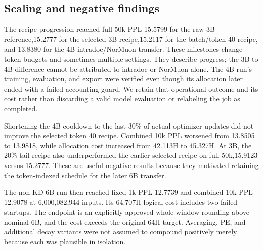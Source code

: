 
\subsection{Scaling and negative findings}

The recipe progression reached full 50k PPL 15.5799 for the raw 3B reference,15.2777 for the selected 3B recipe,15.2117 for the batch/token 40 recipe, and 13.8380 for the 4B intradoc/NorMuon transfer. These milestones change token budgets and sometimes multiple settings. They describe progress; the 3B-to 4B difference cannot be attributed to intradoc or NorMuon alone. The 4B run's training, evaluation, and export were verified even though its allocation later ended with a failed accounting guard. We retain that operational outcome and its cost rather than discarding a valid model evaluation or relabeling the job as completed.

Shortening the 4B cooldown to the last 30\% of actual optimizer updates did not improve the selected token 40 recipe. Combined 10k PPL worsened from 13.8505 to 13.9818, while allocation cost increased from 42.113H to 45.327H. At 3B, the 20\%-tail recipe also underperformed the earlier selected recipe on full 50k,15.9123 versus 15.2777. These are useful negative results because they motivated retaining the token-indexed schedule for the later 6B transfer.

The non-KD 6B run then reached fixed 1k PPL 12.7739 and combined 10k PPL 12.9078 at 6,000,082,944 inputs. Its 64.707H logical cost includes two failed startups. The endpoint is an explicitly approved whole-window rounding above nominal 6B, and the cost exceeds the original 64H target. Averaging, PE, and additional decay variants were not assumed to compound positively merely because each was plausible in isolation.



